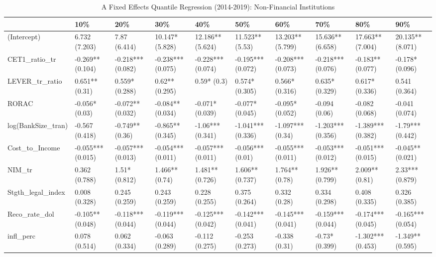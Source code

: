\begin{table}[ht]
\centering
\caption{A Fixed Effects Quantile Regression (2014-2019): Non-Financial Institutions} 
\begingroup\small
\begin{tabular}{llllllllll}
  \toprule
 & 10\% & 20\% & 30\% & 40\% & 50\% & 60\% & 70\% & 80\% & 90\% \\ 
  \midrule
(Intercept) & 6.732 (7.203) & 7.87 (6.414) & 10.147* (5.828) & 12.186** (5.624) & 11.523** (5.53) & 13.203** (5.799) & 15.636** (6.658) & 17.663** (7.004) & 20.135** (8.071) \\ 
  CET1\_ratio\_tr & -0.269** (0.104) & -0.218*** (0.082) & -0.238*** (0.075) & -0.228*** (0.074) & -0.195*** (0.072) & -0.208*** (0.073) & -0.218*** (0.076) & -0.183** (0.077) & -0.178* (0.096) \\ 
  LEVER\_tr\_ratio & 0.651** (0.31) & 0.559* (0.288) & 0.62** (0.295) & 0.59* (0.3) & 0.574* (0.305) & 0.566* (0.316) & 0.635* (0.329) & 0.617* (0.336) & 0.541 (0.364) \\ 
  RORAC & -0.056* (0.03) & -0.072** (0.032) & -0.084** (0.034) & -0.071* (0.039) & -0.077* (0.045) & -0.095* (0.052) & -0.094 (0.06) & -0.082 (0.068) & -0.041 (0.074) \\ 
  log(BankSize\_tran) & -0.567 (0.418) & -0.749** (0.36) & -0.865** (0.345) & -1.06*** (0.341) & -1.041*** (0.336) & -1.097*** (0.34) & -1.203*** (0.356) & -1.389*** (0.382) & -1.79*** (0.442) \\ 
  Cost\_to\_Income & -0.055*** (0.015) & -0.057*** (0.013) & -0.054*** (0.011) & -0.057*** (0.011) & -0.056*** (0.01) & -0.055*** (0.011) & -0.053*** (0.012) & -0.051*** (0.015) & -0.045** (0.021) \\ 
  NIM\_tr & 0.362 (0.788) & 1.51* (0.812) & 1.466** (0.74) & 1.481** (0.726) & 1.606** (0.737) & 1.764** (0.78) & 1.926** (0.799) & 2.009** (0.81) & 2.33*** (0.879) \\ 
  Stgth\_legal\_index & 0.008 (0.328) & 0.245 (0.259) & 0.243 (0.259) & 0.228 (0.255) & 0.375 (0.264) & 0.332 (0.28) & 0.334 (0.298) & 0.408 (0.335) & 0.326 (0.385) \\ 
  Reco\_rate\_dol & -0.105** (0.048) & -0.118*** (0.044) & -0.119*** (0.044) & -0.125*** (0.042) & -0.142*** (0.041) & -0.145*** (0.041) & -0.159*** (0.044) & -0.174*** (0.045) & -0.165*** (0.054) \\ 
  infl\_perc & 0.078 (0.514) & 0.062 (0.334) & -0.063 (0.289) & -0.112 (0.275) & -0.253 (0.273) & -0.338 (0.31) & -0.73* (0.399) & -1.302*** (0.453) & -1.349** (0.595) \\ 

\end{tabular}
\end{table}
